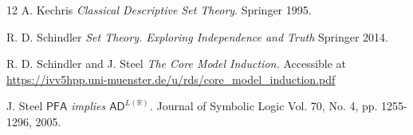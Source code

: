 \documentclass[a4paper,11pt]{article}
\newcommand{\PFA}{\mathsf{PFA}}
\begin{document}
\begin{thebibliography}{12}
A. Kechris 
\textit{Classical Descriptive Set Theory}.  
Springer 1995.

 R. D. Schindler \textit{Set Theory. Exploring Independence and Truth} Springer 2014.



 R. D. Schindler and J. Steel \textit{The Core Model Induction.} Accessible at \url{https://ivv5hpp.uni-muenster.de/u/rds/core_model_induction.pdf}

  J. Steel \textit{$\PFA$ implies $\mathsf{AD}^{L(\mathbb{R} ) } $. } Journal of Symbolic Logic
Vol. 70, No. 4, pp. 1255-1296, 2005.






\end{thebibliography}
\end{document}
